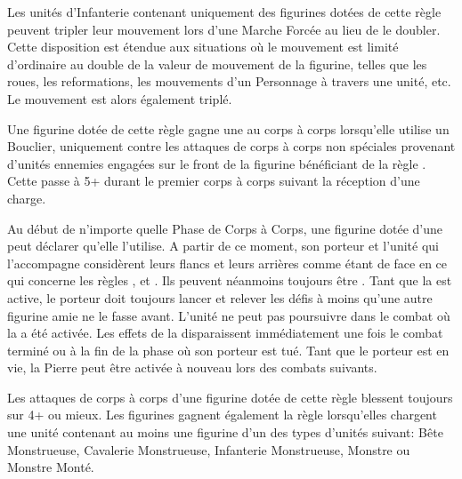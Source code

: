 

\startarmyspecialrules

\armyspecialruleentry{\relentless}

Les unités d'Infanterie contenant uniquement des figurines dotées de cette règle peuvent tripler leur mouvement lors d'une Marche Forcée au lieu de le doubler. Cette disposition est étendue aux situations où le mouvement est limité d'ordinaire au double de la valeur de mouvement de la figurine, telles que les roues, les reformations, les mouvements d'un Personnage à travers une unité, etc. Le mouvement est alors également triplé.

\armyspecialruleentry{\shieldwall}

Une figurine dotée de cette règle gagne une  au corps à corps lorsqu'elle utilise un Bouclier, uniquement contre les attaques de corps à corps non spéciales provenant d'unités ennemies engagées sur le front de la figurine bénéficiant de la règle \shieldwall{}. Cette \wardsave{} passe à 5+ durant le premier corps à corps suivant la réception d'une charge. 

\armyspecialruleentry{\holdstone}

Au début de n'importe quelle Phase de Corps à Corps, une figurine dotée d'une \holdstone peut déclarer qu'elle l'utilise. A partir de ce moment, son porteur et l'unité qui l'accompagne considèrent leurs flancs et leurs arrières comme étant de face en ce qui concerne les règles , \parry et \shieldwall. Ils peuvent néanmoins toujours être . Tant que la \holdstone est active, le porteur doit toujours lancer et relever les défis à moins qu'une autre figurine amie ne le fasse avant. L'unité ne peut pas poursuivre dans le combat où la \holdstone a été activée. Les effets de la \holdstone disparaissent immédiatement une fois le combat terminé ou à la fin de la phase où son porteur est tué. Tant que le porteur est en vie, la Pierre peut être activée à nouveau lors des combats suivants.%

\armyspecialruleentry{\thebiggertheyare}

Les attaques de corps à corps d'une figurine dotée de cette règle blessent toujours sur 4+ ou mieux. Les figurines gagnent également la règle \swiftstride lorsqu'elles chargent une unité contenant au moins une figurine d'un des types d'unités suivant: Bête Monstrueuse, Cavalerie Monstrueuse, Infanterie Monstrueuse, Monstre ou Monstre Monté.


